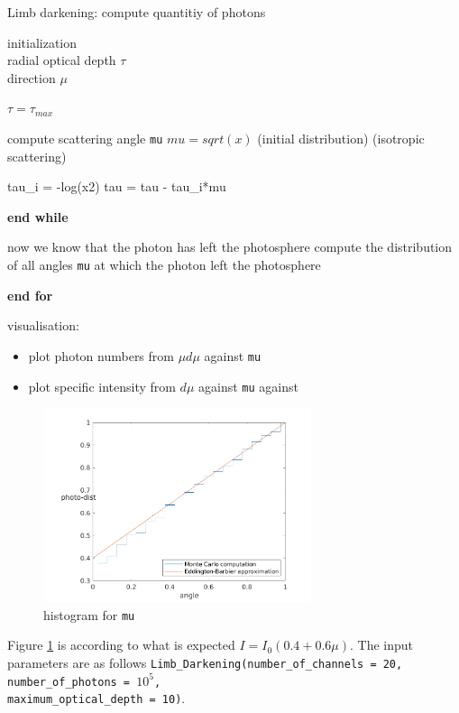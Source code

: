 \documentclass[../main/main.tex]{subfiles}
\begin{document}
\begin{algorithm}
\caption{Limb darkening: compute quantitiy of photons}\label{limb_darkening}
\begin{algorithmic}
\State initialization \\
\quad radial optical depth $\tau$ \\
\quad direction $\mu$


\State $\boxed{\tau = \tau_{max}}$
	
	\State compute scattering angle \texttt{mu}
	 $\boxed{mu = sqrt(x)}$ (initial distribution)
	 (isotropic scattering)
	\EndIf
	
	\State tau\_i = -log(x2) 
	\State tau = tau - tau\_i*mu	
		
	\EndWhile
	\State \textbf{end while}

	\State now we know that the photon has left the photosphere	
	\State compute the distribution of all angles \texttt{mu} at which the photon left the photosphere
	
\EndFor
\State \textbf{end for}

\State visualisation: 
	\begin{itemize}
	\item plot photon numbers from $\mu d\mu$ against \texttt{mu}
	\item plot specific intensity from $d\mu$ against \texttt{mu} against 
	\end{itemize}
\end{algorithmic}
\end{algorithm}

\begin{figure}
\centering
\includegraphics[width=0.7\textwidth]{../../introductory_exercises/limb_darkening/data/number_channels20number_photons100000max_opt_depth10.png}
\caption{histogram for \texttt{mu}}
\label{2D_mu}
\end{figure}
Figure \ref{2D_mu} is according to what is expected $I = I_0(0.4+0.6\mu)$. The input parameters are as follows \texttt{Limb\_Darkening(number\_of\_channels = 20, number\_of\_photons = $10^5$, \\ maximum\_optical\_depth = 10)}.
\end{document}
